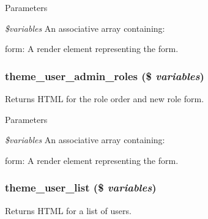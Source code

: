 \begin{DoxyParams}{Parameters}
\item[{\em \$variables}]An associative array containing:
\begin{DoxyItemize}
\item form: A render element representing the form. 
\end{DoxyItemize}\end{DoxyParams}
\hypertarget{group__themeable_gad4ed00385370ab78b0edbc7ec01b729f}{
\subsubsection[{theme\_\-user\_\-admin\_\-roles}]{\setlength{\rightskip}{0pt plus 5cm}theme\_\-user\_\-admin\_\-roles (\$ {\em variables})}}
\label{group__themeable_gad4ed00385370ab78b0edbc7ec01b729f}
Returns HTML for the role order and new role form.


\begin{DoxyParams}{Parameters}
\item[{\em \$variables}]An associative array containing:
\begin{DoxyItemize}
\item form: A render element representing the form. 
\end{DoxyItemize}\end{DoxyParams}
\hypertarget{group__themeable_ga0c401997f59cbc4603fbd353e27eac2d}{
\subsubsection[{theme\_\-user\_\-list}]{\setlength{\rightskip}{0pt plus 5cm}theme\_\-user\_\-list (\$ {\em variables})}}
\label{group__themeable_ga0c401997f59cbc4603fbd353e27eac2d}
Returns HTML for a list of users.


